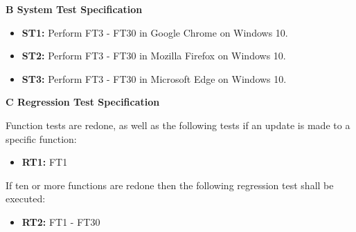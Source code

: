 \documentclass{article}
\begin{document}
		
		\newpage
		\begin{flushleft}
		{\large \textbf{B System Test Specification}}
		\end{flushleft}
		
		
		
		\begin{itemize}
		
  			\item \textbf{ST1:} Perform FT3 - FT30 in Google Chrome on Windows 10. 	
  			
  			\item \textbf{ST2:} Perform FT3 - FT30 in Mozilla Firefox on Windows 10. 
  			
  			\item \textbf{ST3:} Perform FT3 - FT30 in Microsoft Edge on Windows 10. 					
  			
  			
		\end{itemize}
		
		\newpage
		\begin{flushleft}
		{\large \textbf{C Regression Test Specification}}
		\end{flushleft}
			
		\begin{flushleft}
		Function tests are redone, as well as the following tests if an update is made to a specific function:
		\end{flushleft}
		
		\begin{itemize}
		
  			\item \textbf{RT1:} FT1
  			
			  					
		\end{itemize}
		
		\begin{flushleft}
			If ten or more functions are redone then the following regression test shall be executed:
			\end{flushleft}	
		
		\begin{itemize}			
  			
  			\item \textbf{RT2:} FT1 - FT30		

		\end{itemize}
		
		
			
		


\end{document}
